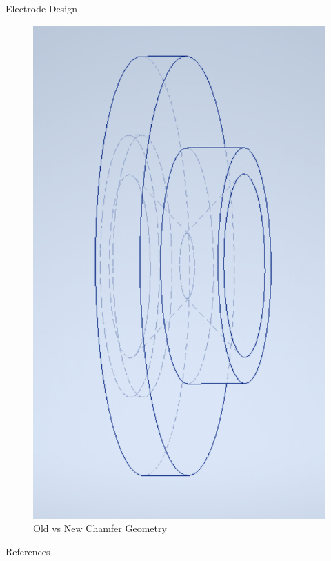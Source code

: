 \documentclass{beamer}
\begin{document}
\begin{frame}{Electrode Design}
\begin{figure}
        \includegraphics[scale=0.2]{newchamfer.pdf}
        \caption{Old vs New Chamfer Geometry}
    \end{figure}
\end{frame}
\begin{frame}[allowframebreaks]{References}
    
    
  
  \end{frame}
\end{document}
